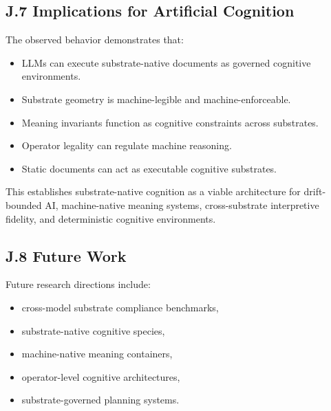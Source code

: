 \subsection*{J.7 Implications for Artificial Cognition}
The observed behavior demonstrates that:
\begin{itemize}
    \item LLMs can execute substrate-native documents as governed cognitive environments.
    \item Substrate geometry is machine-legible and machine-enforceable.
    \item Meaning invariants function as cognitive constraints across substrates.
    \item Operator legality can regulate machine reasoning.
    \item Static documents can act as executable cognitive substrates.
\end{itemize}
This establishes substrate-native cognition as a viable architecture for drift-bounded AI, 
machine-native meaning systems, cross-substrate interpretive fidelity, and deterministic cognitive 
environments.

\subsection*{J.8 Future Work}
Future research directions include:
\begin{itemize}
    \item cross-model substrate compliance benchmarks,
    \item substrate-native cognitive species,
    \item machine-native meaning containers,
    \item operator-level cognitive architectures,
    \item substrate-governed planning systems.
\end{itemize}

